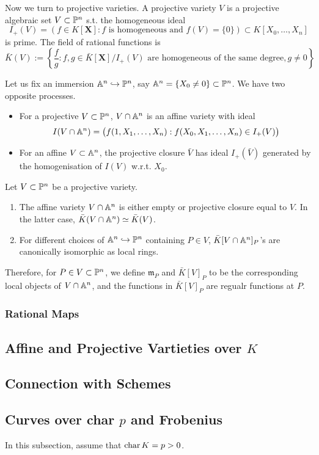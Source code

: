 Now we turn to projective varieties. A projective variety $V$ is a projective algebraic set $V\subset\P^n$ s.t. the homogeneous ideal \[I_+(V) = (f\in K[\boldsymbol{X}] : f\text{ is homogeneous and }f(V) = \{0\})\subset K[X_0, \dots, X_n]\] is prime. The field of rational functions is \[\bar{K}(V) := \left\{ \frac{f}{g} : f, g\in \bar{K}[\boldsymbol{X}]\big/I_+(V)\text{ are homogeneous of the same degree}, g\ne 0 \right\}\]

Let us fix an immersion $\A^n\inject \P^n$, say $\A^n = \{X_0\ne 0\}\subset\P^n$. We have two opposite processes.
\begin{itemize}
    \item For a projective $V\subset \P^n$, $V\cap \A^n$ is an affine variety with ideal \[I(V\cap \A^n) = \big(f(1, X_1, \dots, X_n) : f(X_0, X_1,\dots, X_n)\in I_+(V)\big)\] 
    \item For an affine $V\subset \A^n$, the projective closure $\bar{V}$ has ideal $I_+(\bar{V})$ generated by the homogenisation of $I(V)$ w.r.t. $X_0$.
\end{itemize}
\begin{proposition}
    Let $V\subset\P^n$ be a projective variety.\begin{enumerate}
        \item The affine variety $V\cap \A^n$ is either empty or projective closure equal to $V$. In the latter case, $\bar{K}(V\cap \A^n)\simeq \bar{K}(V)$.
        \item For different choices of $\A^n\inject \P^n$ containing $P\in V$, $\bar{K}[V\cap \A^n]_P$'s are canonically isomorphic as local rings.
    \end{enumerate}
\end{proposition}
Therefore, for $P\in V\subset\P^n$, we define $\mathfrak{m}_P$ and $\bar{K}[V]_P$ to be the corresponding local objects of $V\cap \A^n$, and the functions in $\bar{K}[V]_P$ are regualr functions at $P$. 

\subsubsection{Rational Maps}

\subsection{Affine and Projective Vartieties over $K$}

\subsection{Connection with Schemes}

\subsection{Curves over char $p$ and Frobenius}
In this subsection, assume that $\cha K = p > 0$.

